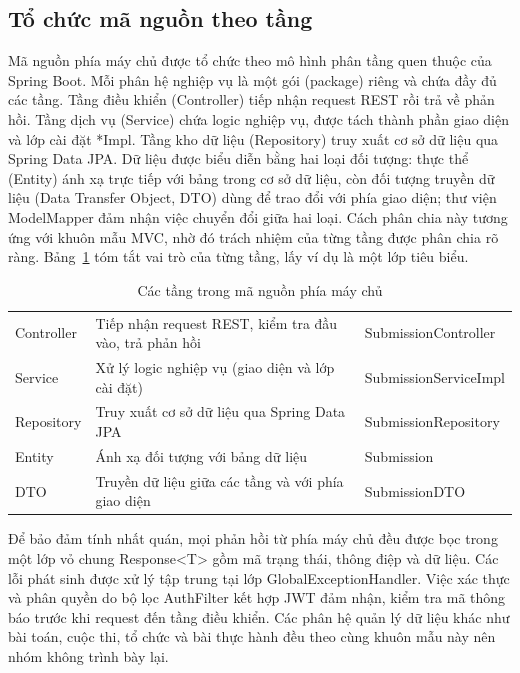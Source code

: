 \documentclass[12pt, a4paper]{report}
\begin{document}
\subsection{Tổ chức mã nguồn theo tầng}

Mã nguồn phía máy chủ được tổ chức theo mô hình phân tầng quen thuộc của Spring Boot. Mỗi phân
hệ nghiệp vụ là một gói (package) riêng và chứa đầy đủ các tầng. Tầng điều khiển (Controller)
tiếp nhận request \ac{REST} rồi trả về phản hồi. Tầng dịch vụ (Service) chứa logic nghiệp vụ,
được tách thành phần giao diện và lớp cài đặt *Impl. Tầng kho dữ liệu (Repository) truy xuất cơ
sở dữ liệu qua Spring Data \ac{JPA}. Dữ liệu được biểu diễn bằng hai loại đối tượng: thực thể
(Entity) ánh xạ trực tiếp với bảng trong cơ sở dữ liệu, còn đối tượng truyền dữ liệu (Data
Transfer Object, DTO) dùng để trao đổi với phía giao diện; thư viện ModelMapper đảm nhận việc
chuyển đổi giữa hai loại. Cách phân chia này tương ứng với khuôn mẫu \ac{MVC}, nhờ đó trách
nhiệm của từng tầng được phân chia rõ ràng. Bảng~\ref{tab:layers} tóm tắt vai trò của từng tầng,
lấy ví dụ là một lớp tiêu biểu.

\begin{table}[H]
  \centering
  \begin{tabular}{|>{\raggedright\arraybackslash}p{2.6cm}|>{\raggedright\arraybackslash}p{6.2cm}|>{\footnotesize\raggedright\arraybackslash}p{3.6cm}|}
    \hline
    \multicolumn{1}{|c|}{\textbf{Tầng}}
      & \multicolumn{1}{c|}{\textbf{Trách nhiệm}}
      & \multicolumn{1}{c|}{\textbf{Lớp ví dụ}} \\
    \hline
    Controller & Tiếp nhận request \ac{REST}, kiểm tra đầu vào, trả phản hồi
      & SubmissionController \\
    \hline
    Service & Xử lý logic nghiệp vụ (giao diện và lớp cài đặt)
      & SubmissionServiceImpl \\
    \hline
    Repository & Truy xuất cơ sở dữ liệu qua Spring Data \ac{JPA}
      & SubmissionRepository \\
    \hline
    Entity & Ánh xạ đối tượng với bảng dữ liệu
      & Submission \\
    \hline
    DTO & Truyền dữ liệu giữa các tầng và với phía giao diện
      & SubmissionDTO \\
    \hline
  \end{tabular}
  \caption{Các tầng trong mã nguồn phía máy chủ}\label{tab:layers}
\end{table}

Để bảo đảm tính nhất quán, mọi phản hồi từ phía máy chủ đều được bọc trong một lớp vỏ chung
Response<T> gồm mã trạng thái, thông điệp và dữ liệu. Các lỗi phát sinh được xử lý tập trung
tại lớp GlobalExceptionHandler. Việc xác thực và phân quyền do bộ lọc AuthFilter kết hợp
\ac{JWT} đảm nhận, kiểm tra mã thông báo trước khi request đến tầng điều khiển. Các phân hệ
quản lý dữ liệu khác như bài toán, cuộc thi, tổ chức và bài thực hành đều theo cùng khuôn mẫu
này nên nhóm không trình bày lại.
\end{document}
